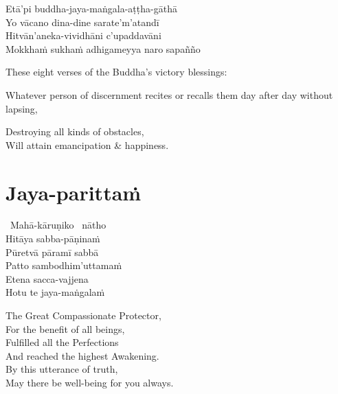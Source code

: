 \begin{pali-hang-continued}
  Etā'pi buddha-jaya-maṅgala-aṭṭha-gāthā\\
  Yo vācano dina-dine sarate'm'atandī\\
  Hitvān'aneka-vividhāni c'upaddavāni\\
  Mokkhaṁ sukhaṁ adhigameyya naro sapañño
\end{pali-hang-continued}

\begin{english-verses}
  These eight verses of the Buddha's victory blessings:
  \begin{english-hangtogether-verses}
    Whatever person of discernment recites or recalls them day after day without lapsing,
  \end{english-hangtogether-verses}
  Destroying all kinds of obstacles,\\
  Will attain emancipation \& happiness.
\end{english-verses}

\suttaRef{[Trad]}



\section{Jaya-parittaṁ}
\label{jaya-parittam}

\begin{pali-hangtogether}
  \anglebracketleft\ \hspace{-0.5mm}Mahā-kāruṇiko \hspace{-0.5mm}\anglebracketright\ nātho\\
  Hitāya sabba-pāṇinaṁ\\
  Pūretvā pāramī sabbā\\
  Patto sambodhim'uttamaṁ\\
  Etena sacca-vajjena\\
  Hotu te jaya-maṅgalaṁ
\end{pali-hangtogether}

\begin{english-verses}
  The Great Compassionate Protector,\\
  For the benefit of all beings,\\
  Fulfilled all the Perfections\\
  And reached the highest Awakening.\\
  By this utterance of truth,\\
  May there be well-being for you always.
\end{english-verses}

